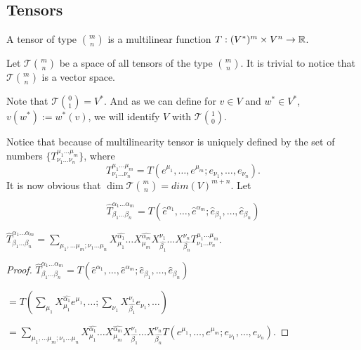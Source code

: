 \documentclass[main.tex]{subfiles}
\begin{document}
\subsection{Tensors} 
\begin{definition}
A tensor of type $\binom{m}{n}$ is a multilinear function $T:(V^*)^m \times V^n \to \mathbb{R}$.
\end{definition}

\noindent
Let $\mathcal{T}\binom{m}{n}$ be a space of all tensors of the type $\binom{m}{n}$. It is trivial to notice that $\mathcal{T}\binom{m}{n}$ is a vector space.

Note that $\mathcal{T}\binom{0}{1} = V^*$. And as we can define for $v\in V$ and $w^*\in V^*$, $v(w^*) := w^*(v)$, we will identify $V$ with $\mathcal{T}\binom{1}{0}$.

Notice that because of multilinearity tensor is uniquely defined by the set of numbers $\{T^{\mu_1\dots\mu_m}_{\nu_1\dots\nu_n}\}$, where
\begin{equation}
\label{ten_coef}
T^{\mu_1\dots\mu_m}_{\nu_1\dots\nu_n} = T(e^{\mu_1}, \dots, e^{\mu_m}; e_{\nu_1}, \dots, e_{\nu_n}).
\end{equation}
It is now obvious that $\dim\mathcal{T}\binom{m}{n} = dim(V)^{m + n}$. 
Let

\begin{equation}
\hat{T}^{\alpha_1\dots\alpha_m}_{\beta_1\dots\beta_n} = T(\hat{e}^{\alpha_1}, \dots, \hat{e}^{\alpha_m}; \hat{e}_{\beta_1}, \dots,\hat{e}_{\beta_n}) 
\end{equation}

\begin{fact}
$\hat{T}^{\alpha_1\dots\alpha_m}_{\beta_1\dots\beta_n} = \sum\limits_{\mu_1,\dots\mu_m;\nu_1\dots\mu_n}X^{\hat{\alpha_1}}_{\mu_1}\dots X^{\hat{\alpha_m}}_{\mu_m}
 X^{\nu_1}_{\hat{\beta_1}}\dots X^{\nu_n}_{\hat{\beta_n}} T^{\mu_1\dots\mu_m}_{\nu_1\dots\nu_n}$.
\end{fact}
\begin{proof}
$\hat{T}^{\alpha_1\dots\alpha_m}_{\beta_1\dots\beta_n} = T(\hat{e}^{\alpha_1}, \dots, \hat{e}^{\alpha_m}; \hat{e}_{\beta_1}, \dots,\hat{e}_{\beta_n})$

$ = T(\sum_{\mu_1} X^{\hat{\alpha_1}}_{\mu_1} e^{\mu_1}, \dots; \sum_{\nu_1} X^{\nu_1}_{\hat{\beta_1}} e_{\nu_1}, \dots)$

$=\sum\limits_{\mu_1,\dots\mu_m;\nu_1\dots\mu_n}X^{\hat{\alpha_1}}_{\mu_1}\dots X^{\hat{\alpha_m}}_{\mu_m}
 X^{\nu_1}_{\hat{\beta_1}}\dots X^{\nu_n}_{\hat{\beta_n}} T(e^{\mu_1}, \dots, e^{\mu_m}; e_{\nu_1}, \dots, e_{\nu_n}).$
\end{proof}
\end{document}
